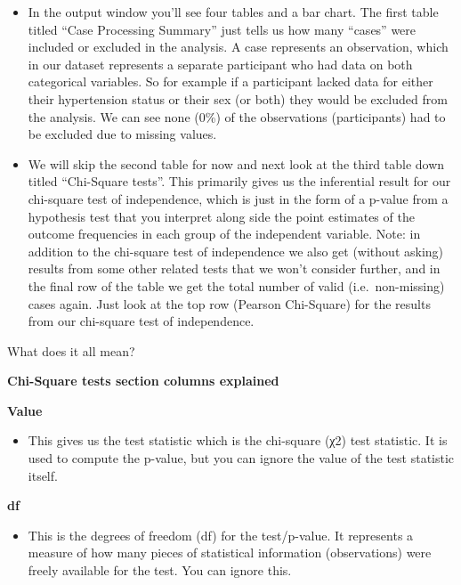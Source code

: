 \documentclass[
]{book}
\providecommand{\tightlist}{%
  \setlength{\itemsep}{0pt}\setlength{\parskip}{0pt}}
\begin{document}
\begin{itemize}
\item
  In the output window you'll see four tables and a bar chart. The first table titled ``Case Processing Summary'' just tells us how many ``cases'' were included or excluded in the analysis. A case represents an observation, which in our dataset represents a separate participant who had data on both categorical variables. So for example if a participant lacked data for either their hypertension status or their sex (or both) they would be excluded from the analysis. We can see none (0\%) of the observations (participants) had to be excluded due to missing values.
\item
  We will skip the second table for now and next look at the third table down titled ``Chi-Square tests''. This primarily gives us the inferential result for our chi-square test of independence, which is just in the form of a p-value from a hypothesis test that you interpret along side the point estimates of the outcome frequencies in each group of the independent variable. Note: in addition to the chi-square test of independence we also get (without asking) results from some other related tests that we won't consider further, and in the final row of the table we get the total number of valid (i.e.~non-missing) cases again. Just look at the top row (Pearson Chi-Square) for the results from our chi-square test of independence.
\end{itemize}

What does it all mean?

\textbf{Chi-Square tests section columns explained}

\textbf{Value}

\begin{itemize}
\tightlist
\item
  This gives us the test statistic which is the chi-square (χ2) test statistic. It is used to compute the p-value, but you can ignore the value of the test statistic itself.
\end{itemize}

\textbf{df}

\begin{itemize}
\tightlist
\item
  This is the degrees of freedom (df) for the test/p-value. It represents a measure of how many pieces of statistical information (observations) were freely available for the test. You can ignore this.
\end{itemize}
\end{document}
